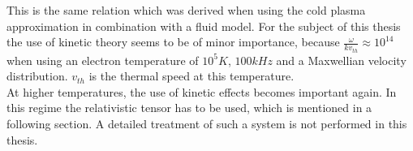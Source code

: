 \documentclass[a4paper,11pt]{thesis}
\begin{document}
This is the same relation which was derived when using the cold plasma approximation in combination with a fluid model. For the subject of this thesis the use of kinetic theory seems to be of minor importance, because $\frac{\omega}{kv_{th}}\approx 10^{14}$ when using an electron temperature of $10^5K$, $100kHz$ and a Maxwellian velocity distribution. $v_{th}$ is the thermal speed at this temperature. \\

At higher temperatures, the use of kinetic effects becomes important again. In this regime the relativistic tensor has to be used, which is mentioned in a following section. A detailed treatment of such a system is not performed in this thesis.






\end{document}
